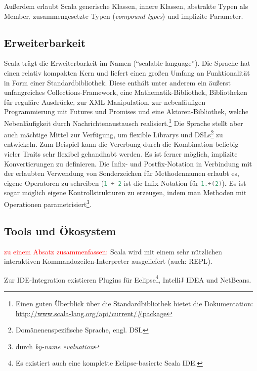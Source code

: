 \documentclass[a4paper, 12pt, hidelinks, listof=totoc, listoftables=totoc, bibliography=totoc]{scrreprt}
\newcommand{\scala}[1]{\lstinline[language=Scala, style=inline]|#1|}
\newcommand{\TODO}[1]{\textcolor{red}{#1}\newline}
\begin{document}
Außerdem erlaubt Scala generische Klassen, innere Klassen, abstrakte Typen als Member, zusammengesetzte Typen (\emph{compound types}) und implizite Parameter.\cite[S. 16 ff., S. 205 ff.]{odersky2008.PIS}\cite[S. 113 ff.]{piepmeyer2010.GFP}\cite{scala-lang2011.CSS}

\subsection{Erweiterbarkeit}

Scala trägt die Erweiterbarkeit im Namen ("`scalable language"').
Die Sprache hat einen relativ kompakten Kern und liefert einen großen Umfang an Funktionalität in Form einer Standardbibliothek. Diese enthält unter anderem ein äußerst unfangreiches Collections-Framework, eine Mathematik-Bibliothek, Bibliotheken für reguläre Ausdrücke, zur XML-Manipulation, zur nebenläufigen Programmierung mit Futures und Promises und eine Aktoren-Bibliothek, welche Nebenläufigkeit durch Nachrichtenaustausch realisiert.\footnote{Einen guten Überblick über die Standardbibliothek bietet die Dokumentation: \url{http://www.scala-lang.org/api/current/\#package}} Die Sprache stellt aber auch mächtige Mittel zur Verfügung, um flexible Librarys und DSLs\footnote{Domänenenspezifische Sprache, engl. \ac{DSL}} zu entwickeln. Zum Beispiel kann die Vererbung durch die Kombination beliebig vieler Traits sehr flexibel gehandhabt werden. Es ist ferner möglich, implizite Konvertierungen zu definieren. Die Infix- und Postfix-Notation in Verbindung mit der erlaubten Verwendung von Sonderzeichen für Methodennamen erlaubt es, eigene Operatoren zu schreiben \linebreak(\mbox{\scala{1 + 2}} ist die Infix-Notation für \scala{1.+(2)}). Es ist sogar möglich eigene Kontrollstrukturen zu erzeugen, indem man Methoden mit Operationen parametrisiert\footnote{durch \emph{by-name evaluation}}.\cite[S. 4 ff.]{odersky2008.PIS}

\subsection{Tools und Ökosystem}

\TODO{zu einem Absatz zusammenfassen:}
Scala wird mit einem sehr nützlichen interaktiven Kommandozeilen-Interpreter ausgeliefert (auch: \ac{REPL}).

Zur IDE-Integration existieren Plugins für Eclipse\footnote{Es existiert auch eine komplette Eclipse-basierte Scala IDE.}, IntelliJ IDEA und NetBeans.
\end{document}
